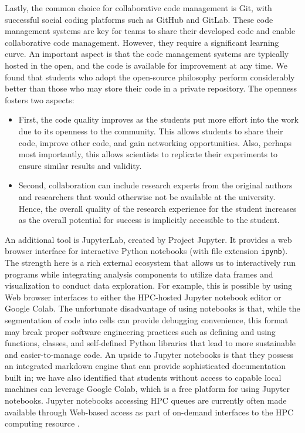 Lastly, the common choice for collaborative code management is Git, with successful social coding platforms such as GitHub and GitLab. These code management systems are key for teams to share their developed code and enable collaborative code management.  However, they require a significant learning curve. An important aspect is that the code management systems are typically hosted in the open, and the code is available for improvement at any time. We found that students who adopt the open-source philosophy perform considerably better than those who may store their code in a private repository. The openness fosters two aspects: 

\begin{itemize}
    \item First, the code quality improves as the students put more effort into the work due to its openness to the community. This allows students to share their code, improve other code, and gain networking opportunities. Also, perhaps most importantly, this allows scientists to replicate their experiments to ensure similar results and validity. 
    \item Second, collaboration can include research experts from the original authors and researchers that would otherwise not be available at the university. Hence, the overall quality of the research experience for the student increases as the overall potential for success is implicitly accessible to the student.
\end{itemize}

An additional tool is JupyterLab, created by Project Jupyter. It provides a web browser interface for interactive Python notebooks (with file extension \verb|ipynb|). The strength here is a rich external ecosystem that allows us to interactively run programs while integrating analysis components to utilize data frames and visualization to conduct data exploration. For example, this is possible by using Web browser interfaces to either the HPC-hosted Jupyter notebook editor or Google Colab. The unfortunate disadvantage of using notebooks is that, while the segmentation of code into cells can provide debugging convenience, this format may break proper software engineering practices such as defining and using functions, classes, and self-defined Python libraries that lead to more sustainable and easier-to-manage code. An upside to Jupyter notebooks is that they possess an integrated markdown engine that can provide sophisticated documentation built in; we have also identified that students without access to capable local machines can leverage Google Colab, which is a free platform for using Jupyter notebooks. Jupyter notebooks accessing HPC queues are currently often made available through Web-based access as part of on-demand interfaces to the HPC computing resource \cite{uva-ondemand}.

